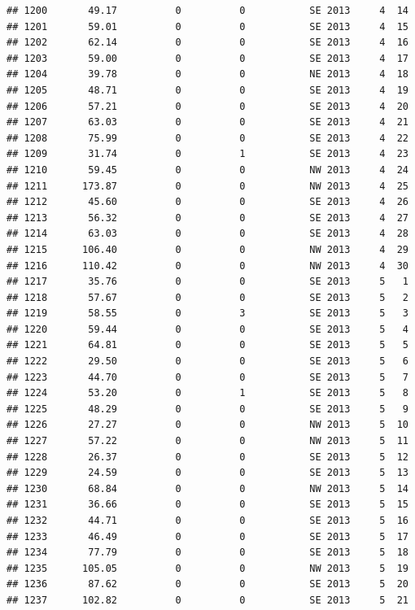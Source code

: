 \documentclass[
]{article}
\begin{document}
\begin{verbatim}
## 1200       49.17          0          0           SE 2013     4  14
## 1201       59.01          0          0           SE 2013     4  15
## 1202       62.14          0          0           SE 2013     4  16
## 1203       59.00          0          0           SE 2013     4  17
## 1204       39.78          0          0           NE 2013     4  18
## 1205       48.71          0          0           SE 2013     4  19
## 1206       57.21          0          0           SE 2013     4  20
## 1207       63.03          0          0           SE 2013     4  21
## 1208       75.99          0          0           SE 2013     4  22
## 1209       31.74          0          1           SE 2013     4  23
## 1210       59.45          0          0           NW 2013     4  24
## 1211      173.87          0          0           NW 2013     4  25
## 1212       45.60          0          0           SE 2013     4  26
## 1213       56.32          0          0           SE 2013     4  27
## 1214       63.03          0          0           SE 2013     4  28
## 1215      106.40          0          0           NW 2013     4  29
## 1216      110.42          0          0           NW 2013     4  30
## 1217       35.76          0          0           SE 2013     5   1
## 1218       57.67          0          0           SE 2013     5   2
## 1219       58.55          0          3           SE 2013     5   3
## 1220       59.44          0          0           SE 2013     5   4
## 1221       64.81          0          0           SE 2013     5   5
## 1222       29.50          0          0           SE 2013     5   6
## 1223       44.70          0          0           SE 2013     5   7
## 1224       53.20          0          1           SE 2013     5   8
## 1225       48.29          0          0           SE 2013     5   9
## 1226       27.27          0          0           NW 2013     5  10
## 1227       57.22          0          0           NW 2013     5  11
## 1228       26.37          0          0           SE 2013     5  12
## 1229       24.59          0          0           SE 2013     5  13
## 1230       68.84          0          0           NW 2013     5  14
## 1231       36.66          0          0           SE 2013     5  15
## 1232       44.71          0          0           SE 2013     5  16
## 1233       46.49          0          0           SE 2013     5  17
## 1234       77.79          0          0           SE 2013     5  18
## 1235      105.05          0          0           NW 2013     5  19
## 1236       87.62          0          0           SE 2013     5  20
## 1237      102.82          0          0           SE 2013     5  21

\end{verbatim}
\end{document}
